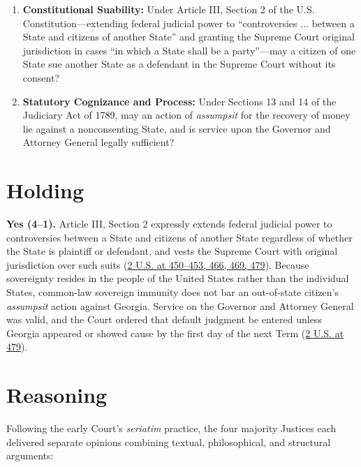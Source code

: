 \documentclass[12pt]{article}
\begin{document}
\begin{enumerate}
  \item \textbf{Constitutional Suability:} Under Article III, Section 2 of the U.S. Constitution---extending federal judicial power to ``controversies ... between a State and citizens of another State'' and granting the Supreme Court original jurisdiction in cases ``in which a State shall be a party''---may a citizen of one State sue another State as a defendant in the Supreme Court without its consent?
  \item \textbf{Statutory Cognizance and Process:} Under Sections 13 and 14 of the Judiciary Act of 1789, may an action of \emph{assumpsit} for the recovery of money lie against a nonconsenting State, and is service upon the Governor and Attorney General legally sufficient?
\end{enumerate}

\section{Holding}

\textbf{Yes (4--1).} Article III, Section 2 expressly extends federal judicial power to controversies between a State and citizens of another State regardless of whether the State is plaintiff or defendant, and vests the Supreme Court with original jurisdiction over such suits (\href{https://supreme.justia.com/cases/federal/us/2/419/}{2 U.S. at 450--453, 466, 469, 479}). Because sovereignty resides in the people of the United States rather than the individual States, common-law sovereign immunity does not bar an out-of-state citizen's \emph{assumpsit} action against Georgia. Service on the Governor and Attorney General was valid, and the Court ordered that default judgment be entered unless Georgia appeared or showed cause by the first day of the next Term (\href{https://supreme.justia.com/cases/federal/us/2/419/}{2 U.S. at 479}).

\section{Reasoning}

Following the early Court's \emph{seriatim} practice, the four majority Justices each delivered separate opinions combining textual, philosophical, and structural arguments:
\end{document}
